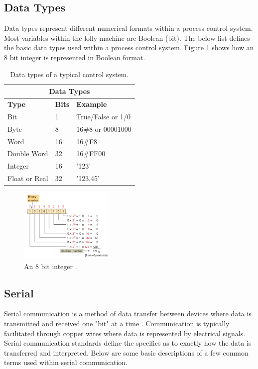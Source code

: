 \subsection{Data Types}
    Data types represent different numerical formats within a process control system. Most variables within the lolly machine are Boolean (bit). The below list defines the basic data types used within a process control system. Figure \ref{fig:int} shows how an 8 bit integer is represented in Boolean format.
    \begin{table}
    \centering
    \caption{Data types of a typical control system.}
        \begin{tabular}{ |p{3cm}|p{2cm}|p{3cm}|  }
                \hline
                \multicolumn{3}{|c|}{\textbf{Data Types}} \\
                \hline
                \textbf{Type}& \textbf{Bits}& \textbf{Example} \\
                \hline
                Bit & 1 & True/False or 1/0 \\
                Byte & 8 & 16\#8 or 00001000 \\
                Word & 16 & 16\#F8 \\
                Double Word & 32 & 16\#FF00 \\
                Integer & 16 & '123' \\
                Float or Real & 32 & '123.45'\\
                \hline
        \end{tabular}
        \label{table:dataTypes}   
        
    \end{table}
    

        \begin{figure}[H]
            \centering
            \includegraphics[width = 0.4\textwidth]{2_images/int.png}
            \caption{An 8 bit integer \cite{petruzella2017programmable}.}
            \label{fig:int}
        \end{figure}         

\subsection{Serial}
    Serial communication is a method of data transfer between devices where data is transmitted and received one "bit" at a time \cite{frenzel2015handbook}. Communication is typically facilitated through copper wires where data is represented by electrical signals. Serial communication standards define the specifics as to exactly how the data is transferred and interpreted. Below are some basic descriptions of a few common terms used within serial communication.
    
